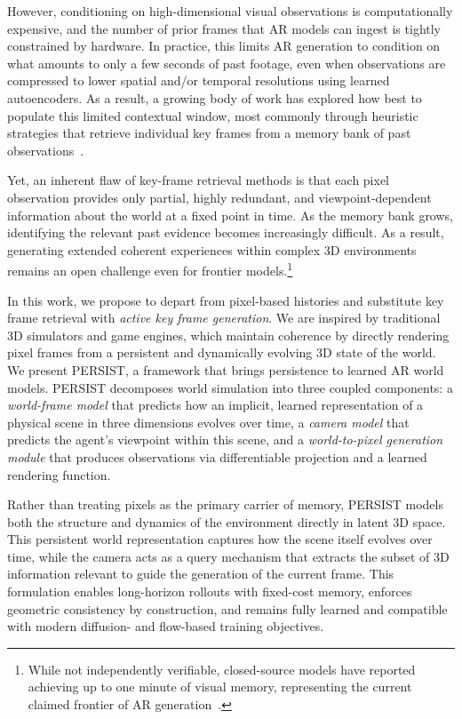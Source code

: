 \documentclass{article}
\theoremstyle{plain}
\theoremstyle{definition}
\theoremstyle{remark}
\begin{document}
However, conditioning on high-dimensional visual observations is computationally expensive, and the number of prior frames that AR models can ingest is tightly constrained by hardware.
In practice, this limits AR generation to condition on what amounts to only a few seconds of past footage, even when observations are compressed to lower spatial and/or temporal resolutions using learned autoencoders.
As a result, a growing body of work has explored how best to populate this limited contextual window, most commonly through heuristic strategies that retrieve individual key frames from a memory bank of past observations~\citep{xiao2025worldmem,huang2025memory}.

Yet, an inherent flaw of key-frame retrieval methods is that each pixel observation provides only partial, highly redundant, and viewpoint-dependent information about the world at a fixed point in time. As the memory bank grows, identifying the relevant past evidence becomes increasingly difficult.
As a result, generating extended coherent experiences within complex 3D environments remains an open challenge even for frontier models.\footnote{While not independently verifiable, closed-source models have reported achieving up to one minute of visual memory, representing the current claimed frontier of AR generation~\citep{genie3}.}

In this work, we propose to depart from pixel-based histories and substitute key frame retrieval with \textit{active key frame generation}.
We are inspired by traditional 3D simulators and game engines, which maintain coherence by directly rendering pixel frames from a persistent and dynamically evolving 3D state of the world.
We present PERSIST, a framework that brings persistence to learned AR world models.
PERSIST decomposes world simulation into three coupled components: a \textit{world-frame model} that predicts how an implicit, learned representation of a physical scene in three dimensions evolves over time, a \textit{camera model} that predicts the agent’s viewpoint within this scene, and a \textit{world-to-pixel generation module} that produces observations via differentiable projection and a learned rendering function.

Rather than treating pixels as the primary carrier of memory, PERSIST models both the structure and dynamics of the environment directly in latent 3D space.
This persistent world representation captures how the scene itself evolves over time, while the camera acts as a query mechanism that extracts the subset of 3D information relevant to guide the generation of the current frame.
This formulation enables long-horizon rollouts with fixed-cost memory, enforces geometric consistency by construction, and remains fully learned and compatible with modern diffusion- and flow-based training objectives.
\end{document}
